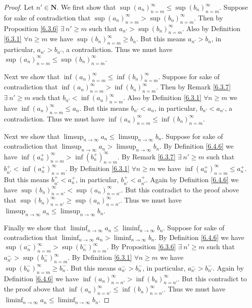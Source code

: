 \begin{proof}
    Let \(n' \in \mathbf{N}\).
    We first show that \(\sup(a_n)_{n = m}^\infty \leq \sup(b_n)_{n = m}^\infty\).
    Suppose for sake of contradiction that \(\sup(a_n)_{n = m}^\infty > \sup(b_n)_{n = m}^\infty\).
    Then by Proposition \ref{6.3.6} \(\exists\ n' \geq m\) such that \(a_{n'} > \sup(b_n)_{n = m}^\infty\).
    Also by Definition \ref{6.3.1} \(\forall n \geq m\) we have \(\sup(b_n)_{n = m}^\infty \geq b_n\).
    But this means \(a_{n'} > b_n\), in particular, \(a_{n'} > b_{n'}\), a contradiction.
    Thus we must have \(\sup(a_n)_{n = m}^\infty \leq \sup(b_n)_{n = m}^\infty\).

    Next we show that \(\inf(a_n)_{n = m}^\infty \leq \inf(b_n)_{n = m}^\infty\).
    Suppose for sake of contradiction that \(\inf(a_n)_{n = m}^\infty > \inf(b_n)_{n = m}^\infty\).
    Then by Remark \ref{6.3.7} \(\exists\ n' \geq m\) such that \(b_{n'} < \inf(a_n)_{n = m}^\infty\).
    Also by Definition \ref{6.3.1} \(\forall n \geq m\) we have \(\inf(a_n)_{n = m}^\infty \leq a_n\).
    But this means \(b_{n'} < a_n\), in particular, \(b_{n'} < a_{n'}\), a contradiction.
    Thus we must have \(\inf(a_n)_{n = m}^\infty \leq \inf(b_n)_{n = m}^\infty\).

    Next we show that \(\limsup_{n \to \infty} a_n \leq \limsup_{n \to \infty} b_n\).
    Suppose for sake of contradiction that \(\limsup_{n \to \infty} a_n > \limsup_{n \to \infty} b_n\).
    By Definition \ref{6.4.6} we have \(\inf(a_n^+)_{n = m}^\infty > \inf(b_n^+)_{n = m}^\infty\).
    By Remark \ref{6.3.7} \(\exists\ n' \geq m\) such that \(b_{n'}^+ < \inf(a_n^+)_{n = m}^\infty\).
    By Definition \ref{6.3.1} \(\forall n \geq m\) we have \(\inf(a_n^+)_{n = m}^\infty \leq a_n^+\).
    But this means \(b_{n'}^+ < a_n^+\), in particular, \(b_{n'}^+ < a_{n'}^+\).
    Again by Definition \ref{6.4.6} we have \(\sup(b_n)_{n = n'}^\infty < \sup(a_n)_{n = n'}^\infty\).
    But this contradict to the proof above that \(\sup(b_n)_{n = n'}^\infty \geq \sup(a_n)_{n = n'}^\infty\).
    Thus we must have \(\limsup_{n \to \infty} a_n \leq \limsup_{n \to \infty} b_n\).

    Finally we show that \(\liminf_{n \to \infty} a_n \leq \liminf_{n \to \infty} b_n\).
    Suppose for sake of contradiction that \(\liminf_{n \to \infty} a_n > \liminf_{n \to \infty} b_n\).
    By Definition \ref{6.4.6} we have \(\sup(a_n^-)_{n = m}^\infty > \sup(b_n^-)_{n = m}^\infty\).
    By Proposition \ref{6.3.6} \(\exists\ n' \geq m\) such that \(a_{n'}^- > \sup(b_n^-)_{n = m}^\infty\).
    By Definition \ref{6.3.1} \(\forall n \geq m\) we have \(\sup(b_n^-)_{n = m}^\infty \geq b_n^-\).
    But this means \(a_{n'}^- > b_n^-\), in particular, \(a_{n'}^- > b_{n'}^-\).
    Again by Definition \ref{6.4.6} we have \(\inf(a_n)_{n = n'}^\infty > \inf(b_n)_{n = n'}^\infty\).
    But this contradict to the proof above that \(\inf(a_n)_{n = n'}^\infty \leq \inf(b_n)_{n = n'}^\infty\).
    Thus we must have \(\liminf_{n \to \infty} a_n \leq \liminf_{n \to \infty} b_n\).
\end{proof}

